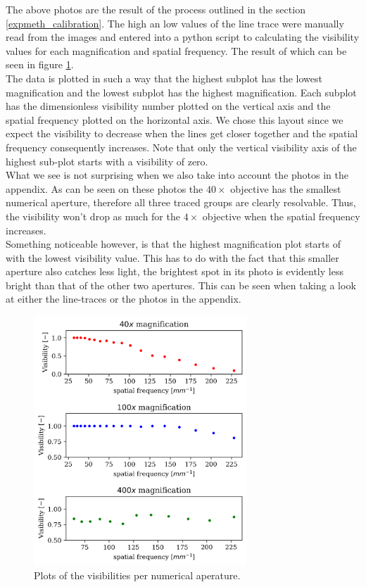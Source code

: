The above photos are the result of the process outlined in the section \ref{expmeth_calibration}. The high an low values of the line trace were manually read from the images and entered into a python script to calculating the visibility values for each magnification and spatial frequency. The result of which can be seen in figure \ref{fig:visibilities}.\\
The data is plotted in such a way that the highest subplot has the lowest magnification and the lowest subplot has the highest magnification. Each subplot has the dimensionless visibility number plotted on the vertical axis and the spatial frequency plotted on the horizontal axis. We chose this layout since we expect the visibility to decrease when the lines get closer together and the spatial frequency consequently increases. Note that only the vertical visibility axis of the highest sub-plot starts with a visibility of zero.\\
What we see is not surprising when we also take into account the photos in the appendix. As can be seen on these photos the $40\times$ objective has the smallest numerical aperture, therefore all three traced groups are clearly resolvable. Thus, the visibility won't drop as much for the $4\times$ objective when the spatial frequency increases.\\
Something noticeable however, is that the highest magnification plot starts of with the lowest visibility value. This has to do with the fact that this smaller aperture also catches less light, the brightest spot in its photo is evidently less bright than that of the other two apertures. This can be seen when taking a look at either the line-traces or the photos in the appendix.

\begin{figure}[h!]
    \centering
    \includegraphics[width=8cm,keepaspectratio]{afbeeldingen/visibilities.png}
    \caption{Plots of the visibilities per numerical aperature.}
    \label{fig:visibilities}
\end{figure}

